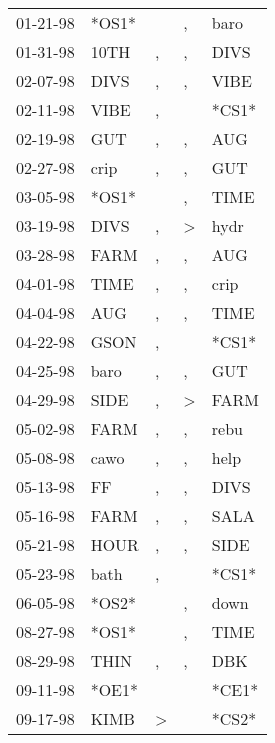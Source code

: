 \begin{supertabular}{lllll}
 01-21-98 &  *OS1* &               &             , &   baro \\
 01-31-98 &   10TH &             , &             , &   DIVS \\
 02-07-98 &   DIVS &             , &             , &   VIBE \\
 02-11-98 &   VIBE &             , &               &  *CS1* \\
 02-19-98 &    GUT &             , &             , &    AUG \\
 02-27-98 &   crip &             , &             , &    GUT \\
 03-05-98 &  *OS1* &               &             , &   TIME \\
 03-19-98 &   DIVS &             , &  \textgreater &   hydr \\
 03-28-98 &   FARM &             , &             , &    AUG \\
 04-01-98 &   TIME &             , &             , &   crip \\
 04-04-98 &    AUG &             , &             , &   TIME \\
 04-22-98 &   GSON &             , &               &  *CS1* \\
 04-25-98 &   baro &             , &             , &    GUT \\
 04-29-98 &   SIDE &             , &  \textgreater &   FARM \\
 05-02-98 &   FARM &             , &             , &   rebu \\
 05-08-98 &   cawo &             , &             , &   help \\
 05-13-98 &     FF &             , &             , &   DIVS \\
 05-16-98 &   FARM &             , &             , &   SALA \\
 05-21-98 &   HOUR &             , &             , &   SIDE \\
 05-23-98 &   bath &             , &               &  *CS1* \\
 06-05-98 &  *OS2* &               &             , &   down \\
 08-27-98 &  *OS1* &               &             , &   TIME \\
 08-29-98 &   THIN &             , &             , &    DBK \\
 09-11-98 &  *OE1* &               &               &  *CE1* \\
 09-17-98 &   KIMB &  \textgreater &               &  *CS2* \\

\end{supertabular}
